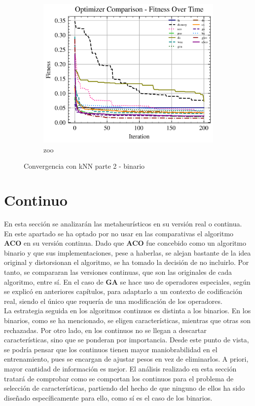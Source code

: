\begin{figure}[htp]
    \begin{subfigure}[htp]{0.45\textwidth}
        \includegraphics[width=\textwidth]{imagenes/fitness_charts/img/binary/zoo/optimizers_fitness_knn.png}
        \caption{zoo}
        \label{fig:convergencia_zoo_knn}
    \end{subfigure}
    \caption{Convergencia con kNN parte 2 - binario}
    \label{fig:convergencia_knn_2}
\end{figure}

\clearpage
\section{Continuo}
En esta sección se analizarán las metaheurísticos en su versión real o continua. En este apartado se ha optado por no usar en las comparativas el algoritmo \textbf{ACO} en su versión continua. Dado que \textbf{ACO} fue concebido como un algoritmo binario y que sus implementaciones, pese a haberlas, se alejan bastante de la idea original y distorsionan el algoritmo, se ha tomado la decisión de no incluirlo. Por tanto, se compararan las versiones continuas, que son las originales de cada algoritmo, entre sí. En el caso de \textbf{GA} se hace uso de operadores especiales, según se explicó en anteriores capítulos, para adaptarlo a un contexto de codificación real, siendo el único que requería de una modificación de los operadores.\\[6pt]
La estrategia seguida en los algoritmos continuos es distinta a los binarios. En los binarios, como se ha mencionado, se eligen características, mientras que otras son rechazadas. Por otro lado, en los continuos no se llegan a descartar características, sino que se ponderan por importancia. Desde este punto de vista, se podría pensar que los continuos tienen mayor maniobrabilidad en el entrenamiento, pues se encargan de ajustar pesos en vez de eliminarlos. A priori, mayor cantidad de información es mejor. El análisis realizado en esta sección tratará de comprobar como se comportan los continuos para el problema de selección de características, partiendo del hecho de que ninguno de ellos ha sido diseñado específicamente para ello, como sí es el caso de los binarios.

